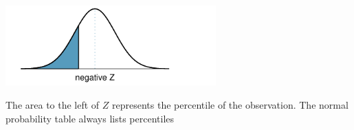 \begin{table}[H]
\begin{center}{\small
\includegraphics[width=81mm]{extraTeX/appendix/figures/normalTails/normalTailLeft} \vspace{2mm} \\

\begin{flushleft}
The area to the left of $Z$ represents the percentile of the observation. The normal probability table always lists percentiles\\
\end{flushleft}

}
\end{center}
\end{table}

